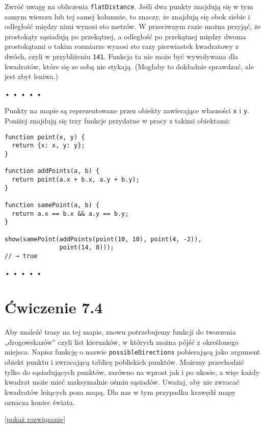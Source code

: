 Zwróć uwagę na obliczenia \texttt{flatDistance}. Jeśli dwa punkty znajdują się w tym samym wierszu lub tej samej kolumnie, to znaczy, że znajdują się obok siebie i odległość między nimi wynosi sto metrów. W przeciwnym razie można przyjąć, że prostokąty sąsiadują po przekątnej, a odległość po przekątnej między dwoma prostokątami o takim rozmiarze wynosi sto razy pierwiastek kwadratowy z dwóch, czyli w przybliżeniu \texttt{141}. Funkcja ta nie może być wywoływana dla kwadratów, które się ze sobą nie stykają. (Mogłaby to dokładnie sprawdzać, ale jest zbyt leniwa.)



\begin{center}
• • • • •
\end{center}

  
Punkty na mapie są reprezentowane przez obiekty zawierające własności \texttt{x} i \texttt{y}. Poniżej znajdują się trzy funkcje przydatne w pracy z takimi obiektami:

  
\begin{verbatim} 
function point(x, y) {
  return {x: x, y: y};
}

function addPoints(a, b) {
  return point(a.x + b.x, a.y + b.y);
}

function samePoint(a, b) {
  return a.x == b.x && a.y == b.y;
}

show(samePoint(addPoints(point(10, 10), point(4, -2)),
               point(14, 8)));
// → true
\end{verbatim}


\begin{center}
• • • • •
\end{center}

  
\section*{Ćwiczenie 7.4}
\label{sec:7.4}
  
    
Aby znaleźć trasy na tej mapie, znowu potrzebujemy funkcji do tworzenia „drogowskazów” czyli list kierunków, w których można pójść z określonego miejsca. Napisz funkcję o nazwie \texttt{possibleDirections} pobierającą jako argument obiekt punktu i zwracającą tablicę pobliskich punktów. Możemy przechodzić tylko do sąsiadujących punktów, zarówno na wprost jak i po ukosie, a więc każdy kwadrat może mieć maksymalnie ośmiu sąsiadów. Uważaj, aby nie zwracać kwadratów leżących poza mapą. Dla nas w tym przypadku krawędź mapy oznacza koniec świata.

  
[\hyperref[sol:7.4]{pokaż rozwiązanie}]
  



